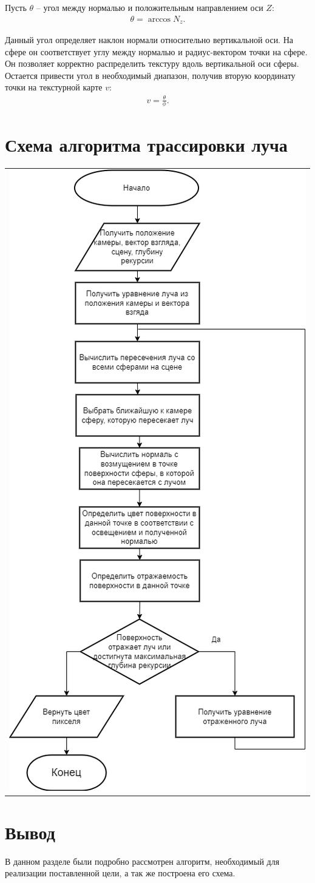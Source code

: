 Пусть $\theta$ -- угол между нормалью и положительным направлением оси $Z$:
\begin{gather}
	\theta=\arccos{N_z}.
\end{gather}

Данный угол определяет наклон нормали относительно вертикальной оси. На сфере он соответствует углу между нормалью и радиус-вектором точки на сфере. Он позволяет корректно распределить текстуру вдоль вертикальной оси сферы. Остается привести угол в необходимый диапазон, получив вторую координату точки на текстурной карте $v$:
\begin{gather}
	v=\frac{\theta}{\phi}.
\end{gather}

\section{Схема алгоритма трассировки луча}
\begin{table}[H]
	\centering
	\begin{tabular}{p{1\linewidth}}
		\centering
		\includegraphics[width=0.6\linewidth]{include/2-10.drawio.png}
		\captionof{figure}{Схема алгоритма трассировки луча}
		\label{img:2-10}
	\end{tabular}
\end{table}

\section*{Вывод}

В данном разделе были подробно рассмотрен алгоритм, необходимый для реализации поставленной цели, а так же построена его схема.